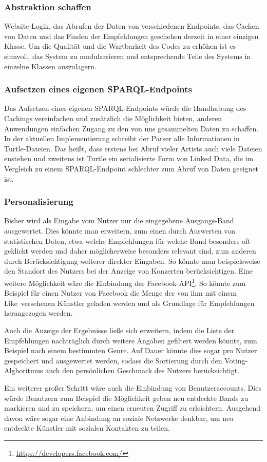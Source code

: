 \subsubsection{Abstraktion schaffen}


Website-Logik, das Abrufen der Daten von verschiedenen Endpoints, das Cachen von Daten und das Finden der Empfehlungen geschehen derzeit in einer einzigen Klasse. Um die Qualität und die Wartbarkeit des Codes zu erhöhen ist es sinnvoll, das System zu modularsieren und entsprechende Teile des Systems in einzelne Klassen auszulagern.


\subsubsection{Aufsetzen eines eigenen SPARQL-Endpoints}


Das Aufsetzen eines eigenen SPARQL-Endpoints würde die Handhabung des Cachings vereinfachen und zusätzlich die Möglichkeit bieten, anderen Anwendungen einfachen Zugang zu den von uns gesammelten Daten zu schaffen. In der aktuellen Implementierung schreibt der Parser alle Informationen in Turtle-Dateien. Das heißt, dass erstens bei Abruf vieler Artists auch viele Dateien enstehen und zweitens ist Turtle ein serialisierte Form von Linked Data, die im Vergleich zu einem SPARQL-Endpoint schlechter zum Abruf von Daten geeignet ist. 


\subsubsection{Personalisierung}
Bisher wird als Eingabe vom Nutzer nur die eingegebene Ausgangs-Band ausgewertet. Dies könnte man erweitern, zum einen durch Auswerten von statistischen Daten, etwa welche Empfehlungen für welche Band besonders oft geklickt werden und daher möglicherweise besonders relevant sind, zum anderen durch Berücksichtigung weiterer direkter Eingaben. So könnte man beispielsweise den Standort des Nutzers bei der Anzeige von Konzerten berücksichtigen. Eine weitere Möglichkeit wäre die Einbindung der Facebook-API\footnote{\url{https://developers.facebook.com/}}. So könnte zum Beispiel für einen Nutzer von Facebook die Menge der von ihm mit einem \glqq Like\grqq \ versehenen Künstler geladen werden und als Grundlage für Empfehlungen herangezogen werden.

Auch die Anzeige der Ergebnisse ließe sich erweitern, indem die Liste der Empfehlungen nachträglich durch weitere Angaben gefiltert werden könnte, zum Beispiel nach einem bestimmten Genre. Auf Dauer könnte dies sogar pro Nutzer gespeichert und ausgewertet werden, sodass die Sortierung durch den Voting-Alghoritmus auch den persönlichen Geschmack des Nutzers berücksichtigt.

Ein weiterer großer Schritt wäre auch die Einbindung von Benutzeraccounts. Dies würde Benutzern zum Beispiel die Möglichkeit geben neu entdeckte Bands zu markieren und zu speichern, um einen erneuten Zugriff zu erleichtern. Ausgehend davon wäre sogar eine Anbindung an soziale Netzwerke denkbar, um neu entdeckte Künstler mit sozialen Kontakten zu teilen.